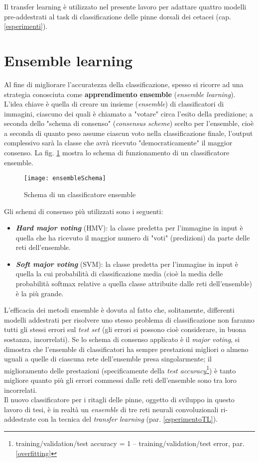 Il transfer learning è utilizzato nel presente lavoro per adattare quattro modelli pre-addestrati al task di classificazione delle pinne dorsali dei cetacei (cap. \ref{esperimenti}).

\section{Ensemble learning}
\label{ensemble}
Al fine di migliorare l'accuratezza della classificazione, spesso si ricorre ad una strategia conosciuta come \textbf{apprendimento ensemble} (\textit{ensemble learning}). L'idea chiave è quella di creare un insieme (\textit{ensemble}) di classificatori di immagini, ciascuno dei quali è chiamato a "votare" circa l'esito della predizione; a seconda dello "schema di consenso" (\textit{consensus scheme}) scelto per l'ensemble, cioè a seconda di quanto peso assume ciascun voto nella classificazione finale, l'output complessivo sarà la classe che avrà ricevuto "democraticamente" il maggior consenso. La fig. \ref{fig:ensembleSchema} mostra lo schema di funzionamento di un classificatore ensemble.
\vspace{3mm}

\begin{figure}[h]
\centering
\texttt{[image: ensembleSchema]}
\caption{Schema di un classificatore ensemble}
\label{fig:ensembleSchema}
\end{figure}

Gli schemi di consenso più utilizzati sono i seguenti:

\begin{itemize}
\item \textbf{\textit{Hard major voting}} (HMV): la classe predetta per l'immagine in input è quella che ha ricevuto il maggior numero di "voti" (predizioni) da parte delle reti dell'ensemble.

\item \textbf{\textit{Soft major voting}} (SVM): la classe predetta per l'immagine in input è quella la cui probabilità di classificazione media (cioè la media delle probabilità softmax relative a quella classe attribuite dalle reti dell'ensemble) è la più grande.
\end{itemize}

L'efficacia dei metodi ensemble è dovuta al fatto che, solitamente, differenti modelli addestrati per risolvere uno stesso problema di classificazione non faranno tutti gli stessi errori sul \textit{test set} (gli errori si possono cioè considerare, in buona sostanza, incorrelati). Se lo schema di consenso applicato è il \textit{major voting}, si dimostra che l'ensemble di classificatori ha sempre prestazioni migliori o almeno uguali a quelle di ciascuna rete dell'ensemble presa singolarmente; il miglioramento delle prestazioni (specificamente della \textit{test accuracy}\footnote{training/validation/test accuracy = 1 -- training/validation/test error, par. \ref{overfitting}}) è tanto migliore quanto più gli errori commessi dalle reti dell'ensemble sono tra loro incorrelati.\cite{dlbook}\cite{ensembles}\\

Il nuovo classificatore per i ritagli delle pinne, oggetto di sviluppo in questo lavoro di tesi, è in realtà un \textit{ensemble} di tre reti neurali convoluzionali ri-addestrate con la tecnica del \textit{transfer learning} (par. \ref{esperimentoTL}).